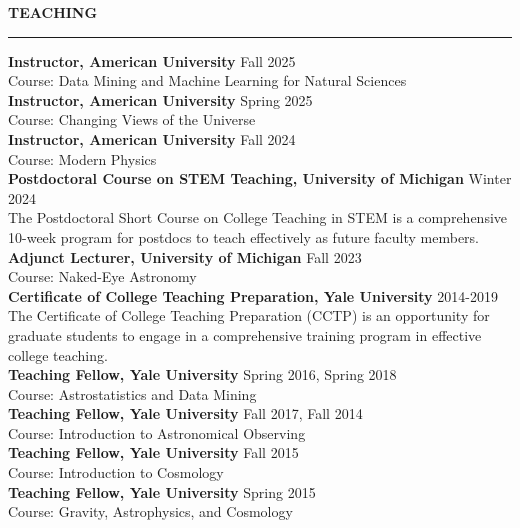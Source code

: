 \documentclass[12pt]{article}
\renewenvironment{section}[1]
  {
  \medskip
  {\color{aublue} \MakeUppercase{\bf #1}}
  \smallskip
  \hrule
  \medskip
  \begin{adjustwidth}{0.3cm}{}
  }
  {
  \end{adjustwidth}
  }
\newcommand{\entry}[3]{{\bf #1} \hfill {#2} \\ {#3}}
\begin{document}
\begin{section}{Teaching}
  \entry{Instructor, American University}{Fall 2025}{Course: Data Mining and Machine Learning for Natural Sciences} \\
  \entry{Instructor, American University}{Spring 2025}{Course: Changing Views of the Universe} \\
  \entry{Instructor, American University}{Fall 2024}{Course: Modern Physics} \\
  \entry{Postdoctoral Course on STEM Teaching, University of Michigan}{Winter 2024}{The Postdoctoral Short Course on College Teaching in STEM is a comprehensive 10-week program for postdocs to teach effectively as future faculty members.} \\
  \entry{Adjunct Lecturer, University of Michigan}{Fall 2023}{Course: Naked-Eye Astronomy} \\
  \entry{Certificate of College Teaching Preparation, Yale University}{2014-2019}{The Certificate of College Teaching Preparation (CCTP) is an opportunity for graduate students to engage in a comprehensive training program in effective college teaching.} \\
  \entry{Teaching Fellow, Yale University}{Spring 2016, Spring 2018}{Course: Astrostatistics and Data Mining} \\
  \entry{Teaching Fellow, Yale University}{Fall 2017, Fall 2014}{Course: Introduction to Astronomical Observing} \\
  \entry{Teaching Fellow, Yale University}{Fall 2015}{Course: Introduction to Cosmology} \\
  \entry{Teaching Fellow, Yale University}{Spring 2015}{Course: Gravity, Astrophysics, and Cosmology}
\end{section}
\end{document}

